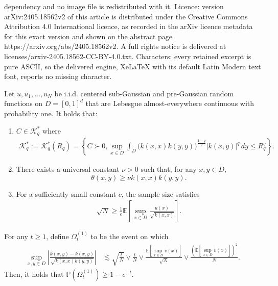 \documentclass[10pt,a4paper]{amsart}
\newcommand{\E}{\mathbb{E}}
\renewcommand{\P}{\mathbb{P}}
\newcommand{\abs}[1]{\ensuremath{\left\lvert #1 \right\rvert}}
\newcommand{\hatk}{\hat{k}}
\newcommand{\inbraces}[1]{\left\{#1\right\}}           %
\newcommand{\insquare}[1]{\left[#1\right]}             %
\newcommand{\mcK}{\mathcal{K}}
\newcommand{\tildev}{\tilde{v}}
\begin{document}
dependency and no image file is redistributed with it. Licence: version arXiv:2405.18562v2 of this article is distributed under the Creative Commons Attribution 4.0 International licence, as recorded in the arXiv licence metadata for this exact version and shown on the abstract page https://arxiv.org/abs/2405.18562v2. A full rights notice is delivered at licenses/arxiv-2405.18562-CC-BY-4.0.txt. Characters: every retained excerpt is pure ASCII, so the delivered engine, XeLaTeX with its default Latin Modern text font, reports no missing character.
\begin{assumption}\label{ass:mainAssumption}
Let $u, u_1,\dots, u_N $ be i.i.d. centered sub-Gaussian and pre-Gaussian random functions on $D=[0,1]^d$ that are Lebesgue almost-everywhere continuous with probability one. It holds that:
    \begin{enumerate}[label=(\roman*)]
        \item $C \in \mcK_q^*$ where 
        \begin{align*}
             \mcK_q^* 
             :=  \mcK_q^*(R_q)
             =
             \inbraces{
             C \succ 0,
             \sup_{x \in D} \int_D \bigl(k(x,x)k(y,y) \bigr)^{\frac{1-q}{2}} |k(x,y)|^q \, dy \le R_q^q 
             }.
        \end{align*}
        \item There exists  a universal constant $\nu > 0$ such that, for any $x,y\in D,$
        $$
        \theta(x,y) \ge \nu k(x,x)k(y,y).
        $$
        \item For a sufficiently small constant $c$, the sample size satisfies 
        \begin{align*}
             \sqrt{N} \ge \frac{1}{c} \E \insquare{\sup_{x \in D} \frac{u(x)}{\sqrt{k(x,x)}}}.
        \end{align*}
    \end{enumerate}
\end{assumption}

\begin{lemma}\label{lem:SampleCovFnConcentration}
    For any $t \ge 1$, define $\Omega^{(1)}_t$ to be the event on which 
    \begin{align*}
        \sup_{x,y\in D} 
        \abs{ \frac{\hatk(x,y) - k(x,y)}{\sqrt{k(x,x) k(y,y)}} }
        &\lesssim 
            \sqrt{\frac{t}{N}}
            \lor 
            \frac{t}{N}
            \lor 
            \frac{\E[\sup_{x \in D} \tildev(x)]}{\sqrt{N}}
            \lor 
            \frac{ (\E[\sup_{x \in D} \tildev(x)])^2}{N}.
    \end{align*}
    Then, it holds that $\P(\Omega^{(1)}_t) \ge 1-e^{-t}.$ 
\end{lemma}
\end{document}
